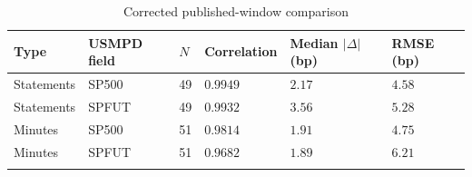 \begin{table}[htbp]
\centering
{\fontsize{9.7}{12}\selectfont\renewcommand{\arraystretch}{1.22}\setlength{\tabcolsep}{4pt}
\begin{tabularx}{\linewidth}{@{}L{25mm}L{25mm}C{10mm}C{25mm}C{34mm}X@{}}
\toprule{}
\textbf{Type} & \textbf{USMPD field} & \textbf{$N$} & \textbf{Correlation} & \textbf{Median $|\Delta|$ (bp)} & \textbf{RMSE (bp)} \\ \midrule
Statements & SP500 & 49 & $0.9949$ & $2.17$ & $4.58$ \\ \hline
Statements & SPFUT & 49 & $0.9932$ & $3.56$ & $5.28$ \\ \hline
Minutes & SP500 & 51 & $0.9814$ & $1.91$ & $4.75$ \\ \hline
Minutes & SPFUT & 51 & $0.9682$ & $1.89$ & $6.21$ \\ \hline
{}\bottomrule\end{tabularx}}
\caption[Corrected published-window comparison]{Corrected published-window comparison}\label{tab:crosscheck}
\end{table}

